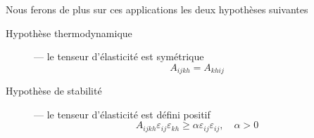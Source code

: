 Nous ferons de plus sur ces applications les deux hypothèses suivantes
\begin{description}
    \item[Hypothèse thermodynamique] --- le tenseur d'élasticité est symétrique
        \begin{equation}
            A_{ijkh} = A_{khij}
            \label{eq:Ch05-003}
        \end{equation}
    \item[Hypothèse de stabilité] --- le tenseur d'élasticité est défini positif
        \begin{equation}
            A_{ijkh} \varepsilon_{ij} \varepsilon_{kh} \geq \alpha \varepsilon_{ij} \varepsilon_{ij}, \quad \alpha > 0
            \label{eq:Ch05-004}
        \end{equation}
\end{description}

